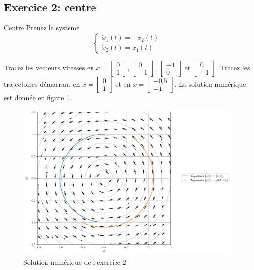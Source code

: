         \subsection{Exercice 2: centre}
            \begin{exercise}{Centre}
                Prenez le système
                \begin{equation}
                    \begin{cases}
                        \dot{x}_1(t) = -x_2(t)\\
                        \dot{x}_2(t) = x_1(t)
                    \end{cases}
                \end{equation}
            \end{exercise}
            Tracez les vecteurs vitesses en $x = \begin{bmatrix}0 \\ 1\end{bmatrix}$, $\begin{bmatrix}0 \\ -1\end{bmatrix}$, $\begin{bmatrix}-1 \\ 0\end{bmatrix}$ et $\begin{bmatrix}0 \\ -1\end{bmatrix}$. Tracez les trajectoires démarrant en $x = \begin{bmatrix}0 \\ 1\end{bmatrix}$ et en $x = \begin{bmatrix}-0.5 \\ -1\end{bmatrix}$.
            La solution numérique est donnée en figure \ref{fig:pdp_exercice_2_2}.
            \begin{figure}[ht!]
                \centering
                \includegraphics[width=\textwidth]{images/pdp_exercice_2_2.jpg}
                \caption{Solution numérique de l'exercice 2}
                \label{fig:pdp_exercice_2_2}
            \end{figure}

